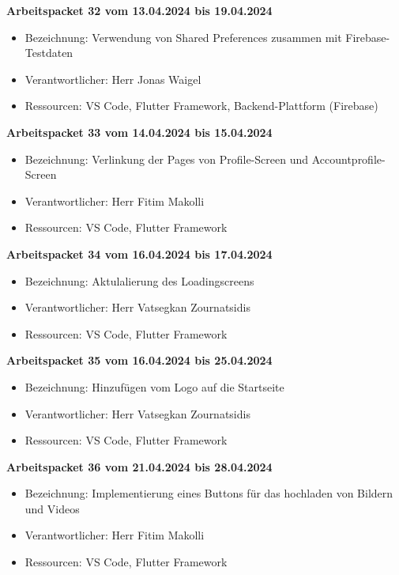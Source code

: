 \textbf{Arbeitspacket 32 vom 13.04.2024 bis 19.04.2024}
\begin{itemize}[itemsep=0pt]
	\item{Bezeichnung: Verwendung von Shared Preferences zusammen mit Firebase-Testdaten}
	\item{Verantwortlicher: Herr Jonas Waigel} 
	\item{Ressourcen: VS Code, Flutter Framework, Backend-Plattform (Firebase)} 
\end{itemize}


\textbf{Arbeitspacket 33 vom 14.04.2024 bis 15.04.2024}
\begin{itemize}[itemsep=0pt]
	\item{Bezeichnung: Verlinkung der Pages von Profile-Screen und Accountprofile-Screen}
	\item{Verantwortlicher: Herr Fitim Makolli} 
	\item{Ressourcen: VS Code, Flutter Framework} 
\end{itemize}

\textbf{Arbeitspacket 34 vom 16.04.2024 bis 17.04.2024}
\begin{itemize}[itemsep=0pt]
	\item{Bezeichnung: Aktulalierung des Loadingscreens}
	\item{Verantwortlicher: Herr Vatsegkan Zournatsidis} 
	\item{Ressourcen: VS Code, Flutter Framework} 
\end{itemize} 

\textbf{Arbeitspacket 35 vom 16.04.2024 bis 25.04.2024}
\begin{itemize}[itemsep=0pt]
	\item{Bezeichnung: Hinzufügen vom Logo auf die Startseite}
	\item{Verantwortlicher: Herr Vatsegkan Zournatsidis} 
	\item{Ressourcen: VS Code, Flutter Framework} 

\end{itemize}

\textbf{Arbeitspacket 36 vom 21.04.2024 bis 28.04.2024}
\begin{itemize}[itemsep=0pt]
	\item{Bezeichnung: Implementierung eines Buttons für das hochladen von Bildern und Videos}
	\item{Verantwortlicher: Herr Fitim Makolli} 
	\item{Ressourcen: VS Code, Flutter Framework} 
\end{itemize}

